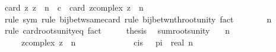 \begin{isabellebody}
\ {\isachardoublequoteopen}card\ {\isacharbraceleft}{\kern0pt}z{\isachardot}{\kern0pt}\ z\ {\isacharcircum}{\kern0pt}\ n\ {\isacharequal}{\kern0pt}\ c{\isacharbraceright}{\kern0pt}\ {\isacharequal}{\kern0pt}\ card\ {\isacharbraceleft}{\kern0pt}z{\isacharcolon}{\kern0pt}{\isacharcolon}{\kern0pt}complex{\isachardot}{\kern0pt}\ z\ {\isacharcircum}{\kern0pt}\ n\ {\isacharequal}{\kern0pt}\ {}{\isacharbraceright}{\kern0pt}{\isachardoublequoteclose}\isanewline
\ \ \ \ \isamarkupfalse%
\ {\isacharparenleft}{\kern0pt}rule\ sym{\isacharcomma}{\kern0pt}\ rule\ bij{\isacharunderscore}{\kern0pt}betw{\isacharunderscore}{\kern0pt}same{\isacharunderscore}{\kern0pt}card{\isacharcomma}{\kern0pt}\ rule\ bij{\isacharunderscore}{\kern0pt}betw{\isacharunderscore}{\kern0pt}nth{\isacharunderscore}{\kern0pt}root{\isacharunderscore}{\kern0pt}unity{\isacharparenright}{\kern0pt}\ fact{\isacharplus}{\kern0pt}\isanewline
\ \ \isamarkupfalse%
\ \isamarkupfalse%
\ {\isachardoublequoteopen}{\isasymdots}\ {\isacharequal}{\kern0pt}\ n{\isachardoublequoteclose}\ \isamarkupfalse%
\ {\isacharparenleft}{\kern0pt}rule\ card{\isacharunderscore}{\kern0pt}roots{\isacharunderscore}{\kern0pt}unity{\isacharunderscore}{\kern0pt}eq{\isacharparenright}{\kern0pt}\ fact{\isacharplus}{\kern0pt}\isanewline
\ \ \isamarkupfalse%
\ \isamarkupfalse%
\ {\isacharquery}{\kern0pt}thesis\ \isacommand{{\isachardot}{\kern0pt}}\isamarkupfalse%
\isanewline
{}\isamarkupfalse%
%
\endisatagproof
{\isafoldproof}%
%
\isadelimproof
\isanewline
%
\endisadelimproof
\isanewline
{}\isamarkupfalse%
\ sum{\isacharunderscore}{\kern0pt}roots{\isacharunderscore}{\kern0pt}unity{\isacharcolon}{\kern0pt}\isanewline
\ \ \ {\isachardoublequoteopen}n\ {\isachargreater}{\kern0pt}\ {}{\isachardoublequoteclose}\isanewline
\ \ \ \ \ {\isachardoublequoteopen}{\isasymSum}{\isacharbraceleft}{\kern0pt}z{\isacharcolon}{\kern0pt}{\isacharcolon}{\kern0pt}complex{\isachardot}{\kern0pt}\ z\ {\isacharcircum}{\kern0pt}\ n\ {\isacharequal}{\kern0pt}\ {}{\isacharbraceright}{\kern0pt}\ {\isacharequal}{\kern0pt}\ {}{\isachardoublequoteclose}\isanewline
%
\isadelimproof
%
\endisadelimproof
%
\isatagproof
{}\isamarkupfalse%
\ {\isacharminus}{\kern0pt}\isanewline
\ \ \isamarkupfalse%
\ {\isasymomega}\ \ {\isachardoublequoteopen}{\isasymomega}\ {\isacharequal}{\kern0pt}\ cis\ {\isacharparenleft}{\kern0pt}{}\ {\isacharasterisk}{\kern0pt}\ pi\ {\isacharslash}{\kern0pt}\ real\ n{\isacharparenright}{\kern0pt}{\isachardoublequoteclose}\isanewline

\end{isabellebody}
